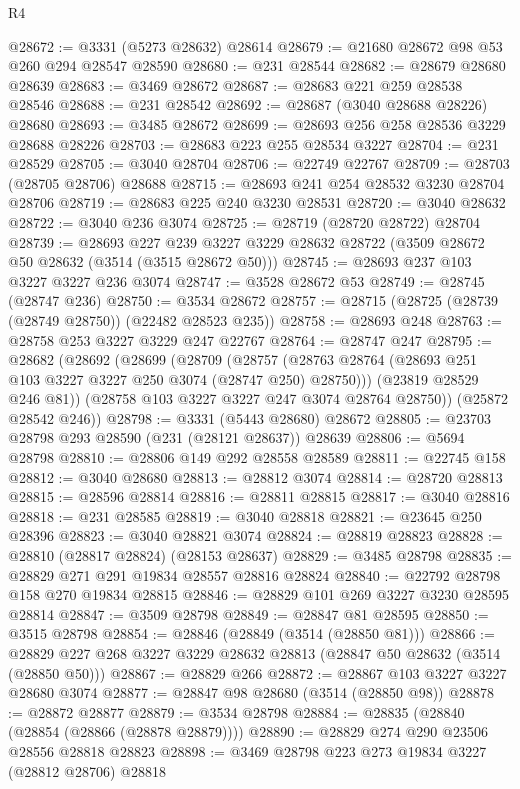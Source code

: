 \begin{lexlean}{R4}
\begin{coremodule}
@28672 := @3331 (@5273 @28632) @28614
@28679 := @21680 @28672 @98 @53 @260 @294 @28547 @28590
@28680 := @231 @28544
@28682 := @28679 @28680 @28639
@28683 := @3469 @28672
@28687 := @28683 @221 @259 @28538 @28546
@28688 := @231 @28542
@28692 := @28687 (@3040 @28688 @28226) @28680
@28693 := @3485 @28672
@28699 := @28693 @256 @258 @28536 @3229 @28688 @28226
@28703 := @28683 @223 @255 @28534 @3227
@28704 := @231 @28529
@28705 := @3040 @28704
@28706 := @22749 @22767
@28709 := @28703 (@28705 @28706) @28688
@28715 := @28693 @241 @254 @28532 @3230 @28704 @28706
@28719 := @28683 @225 @240 @3230 @28531
@28720 := @3040 @28632
@28722 := @3040 @236 @3074
@28725 := @28719 (@28720 @28722) @28704
@28739 := @28693
    @227
    @239
    @3227
    @3229
    @28632
    @28722
    (@3509 @28672 @50 @28632 (@3514 (@3515 @28672 @50)))
@28745 := @28693 @237 @103 @3227 @3227 @236 @3074
@28747 := @3528 @28672 @53
@28749 := @28745 (@28747 @236)
@28750 := @3534 @28672
@28757 := @28715 (@28725 (@28739 (@28749 @28750)) (@22482 @28523 @235))
@28758 := @28693 @248
@28763 := @28758 @253 @3227 @3229 @247 @22767
@28764 := @28747 @247
@28795 := @28682
    (@28692
      (@28699
        (@28709
          (@28757 (@28763 @28764 (@28693 @251 @103 @3227 @3227 @250 @3074 (@28747 @250) @28750)))
          (@23819 @28529 @246 @81))
        (@28758 @103 @3227 @3227 @247 @3074 @28764 @28750))
      (@25872 @28542 @246))
@28798 := @3331 (@5443 @28680) @28672
@28805 := @23703 @28798 @293 @28590 (@231 (@28121 @28637)) @28639
@28806 := @5694 @28798
@28810 := @28806 @149 @292 @28558 @28589
@28811 := @22745 @158
@28812 := @3040 @28680
@28813 := @28812 @3074
@28814 := @28720 @28813
@28815 := @28596 @28814
@28816 := @28811 @28815
@28817 := @3040 @28816
@28818 := @231 @28585
@28819 := @3040 @28818
@28821 := @23645 @250 @28396
@28823 := @3040 @28821 @3074
@28824 := @28819 @28823
@28828 := @28810 (@28817 @28824) (@28153 @28637)
@28829 := @3485 @28798
@28835 := @28829 @271 @291 @19834 @28557 @28816 @28824
@28840 := @22792 @28798 @158 @270 @19834 @28815
@28846 := @28829 @101 @269 @3227 @3230 @28595 @28814
@28847 := @3509 @28798
@28849 := @28847 @81 @28595
@28850 := @3515 @28798
@28854 := @28846 (@28849 (@3514 (@28850 @81)))
@28866 := @28829 @227 @268 @3227 @3229 @28632 @28813 (@28847 @50 @28632 (@3514 (@28850 @50)))
@28867 := @28829 @266
@28872 := @28867 @103 @3227 @3227 @28680 @3074
@28877 := @28847 @98 @28680 (@3514 (@28850 @98))
@28878 := @28872 @28877
@28879 := @3534 @28798
@28884 := @28835 (@28840 (@28854 (@28866 (@28878 @28879))))
@28890 := @28829 @274 @290 @23506 @28556 @28818 @28823
@28898 := @3469 @28798 @223 @273 @19834 @3227 (@28812 @28706) @28818

\end{coremodule}
\end{lexlean}
